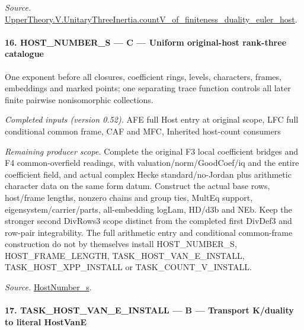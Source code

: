 \emph{Source.} \href{https://github.com/CocoSgt/riemann-hypothesis-lean/blob/7cbf7a0c32fca1badf05931879a37c3f8a2b03b4/src/Development/AutomorphicArithmetic/AutomorphicVarieties/ModularityArgument/ThresholdArguments/DenseThresholdCases/CountVOf.lean#L33-L60}{UpperTheory.V.UnitaryThreeInertia.countV\_\allowbreak of\_\allowbreak finiteness\_\allowbreak duality\_\allowbreak euler\_\allowbreak host}.



\paragraph{16. HOST\_\allowbreak NUMBER\_\allowbreak S — C — Uniform original-host rank-three catalogue}

One exponent before all closures, coefficient rings, levels, characters, frames, embeddings and marked points; one separating trace function controls all later finite pairwise nonisomorphic collections.

\emph{Completed inputs (version 0.52).} AFE full Host entry at original scope, LFC full conditional common frame, CAF and MFC, Inherited host-count consumers

\emph{Remaining producer scope.} Complete the original F3 local coefficient bridges and F4 common-overfield readings, with valuation/norm/GoodCoef/iq and the entire coefficient field, and actual complex Hecke standard/no-Jordan plus arithmetic character data on the same form datum. Construct the actual base rows, host/frame lengths, nonzero chains and group ties, MultEq support, eigensystem/carrier/parts, all-embedding logLam, HD/d3b and NEb. Keep the stronger second DivRows3 scope distinct from the completed first DivDef3 and row-pair integrability. The full arithmetic entry and conditional common-frame construction do not by themselves install HOST\_\allowbreak NUMBER\_\allowbreak S, HOST\_\allowbreak FRAME\_\allowbreak LENGTH, TASK\_\allowbreak HOST\_\allowbreak VAN\_\allowbreak E\_\allowbreak INSTALL, TASK\_\allowbreak HOST\_\allowbreak XPP\_\allowbreak INSTALL or TASK\_\allowbreak COUNT\_\allowbreak V\_\allowbreak INSTALL.

\emph{Source.} \href{https://github.com/CocoSgt/riemann-hypothesis-lean/blob/7cbf7a0c32fca1badf05931879a37c3f8a2b03b4/src/Development/AutomorphicArithmetic/AutomorphicVarieties/ModularityArgument/ThresholdArguments/DenseThresholdCases/HostNumberS.lean#L18-L28}{HostNumber\_\allowbreak s}.



\paragraph{17. TASK\_\allowbreak HOST\_\allowbreak VAN\_\allowbreak E\_\allowbreak INSTALL — B — Transport K/duality to literal HostVanE}

